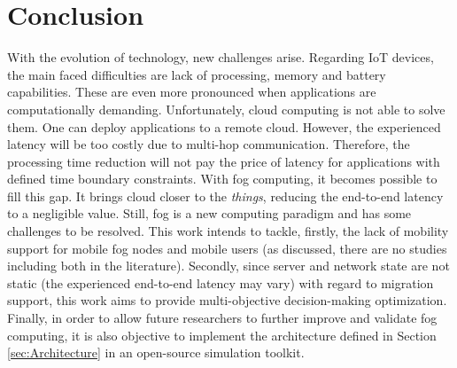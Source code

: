 \chapter{Conclusion}
\label{sec:Conclusion}
With the evolution of technology, new challenges arise. Regarding IoT devices, the main faced difficulties are lack of processing, memory and battery capabilities. These are even more pronounced when applications are computationally demanding. Unfortunately, cloud computing is not able to solve them. One can deploy applications to a remote cloud. However, the experienced latency will be too costly due to multi-hop communication. Therefore, the processing time reduction will not pay the price of latency for applications with defined time boundary constraints. With fog computing, it becomes possible to fill this gap. It brings cloud closer to the \textit{things}, reducing the end-to-end latency to a negligible value. Still, fog is a new computing paradigm and has some challenges to be resolved. This work intends to tackle, firstly, the lack of mobility support for mobile fog nodes and mobile users (as discussed, there are no studies including both in the literature). Secondly, since server and network state are not static (the experienced end-to-end latency may vary) with regard to migration support, this work aims to provide multi-objective decision-making optimization. Finally, in order to allow future researchers to further improve and validate fog computing, it is also objective to implement the architecture defined in Section \ref{sec:Architecture} in an open-source simulation toolkit.
